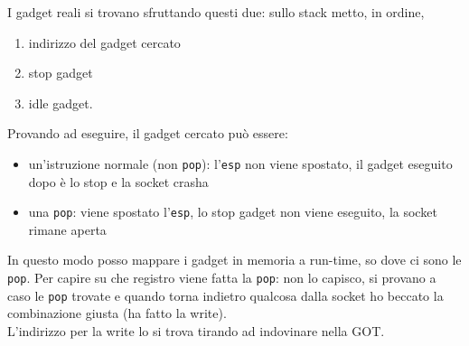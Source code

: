 I gadget reali si trovano sfruttando questi due: sullo stack metto, in ordine, 
\begin{enumerate}
	\item indirizzo del gadget cercato
	\item stop gadget
	\item idle gadget. 
\end{enumerate}

Provando ad eseguire, il gadget cercato può essere:
\begin{itemize}
	\item un'istruzione normale (non \texttt{pop}): l'\texttt{esp} non viene spostato, il gadget eseguito dopo è lo stop e la socket crasha
	\item una \texttt{pop}: viene spostato l'\texttt{esp}, lo stop gadget non viene eseguito, la socket rimane aperta
\end{itemize}

In questo modo posso mappare i gadget in memoria a run-time, so dove ci sono le \texttt{pop}. Per capire su che registro viene fatta la \texttt{pop}: non lo capisco, si provano a caso le \texttt{pop} trovate e quando torna indietro qualcosa dalla socket ho beccato la combinazione giusta (ha fatto la write).\\

L'indirizzo per la write lo si trova tirando ad indovinare nella GOT.\\

